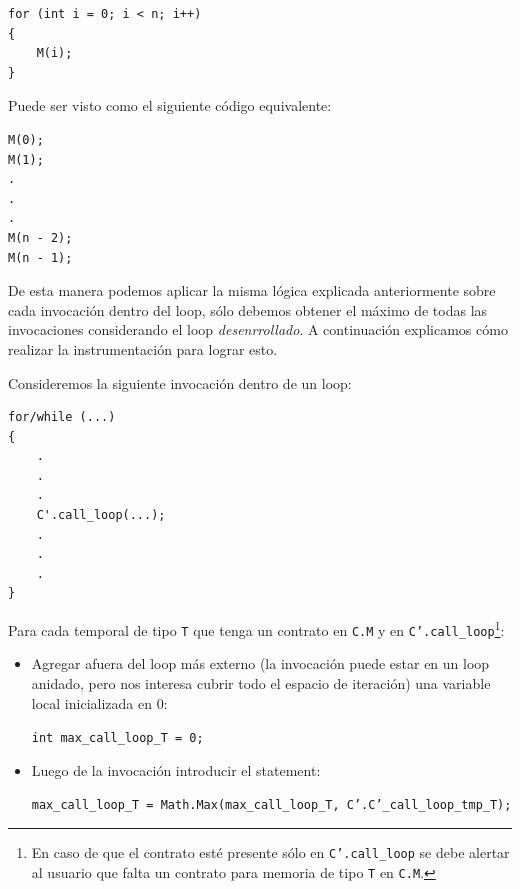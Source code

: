 \documentclass[12pt,a4paper]{article}
\newcommand\mono[1]{\texttt{#1}}
\begin{document}
				\vspace{15pt}
				\begin{lstlisting}[caption=Ejemplo de loop]
for (int i = 0; i < n; i++)
{
	M(i);
}
				\end{lstlisting}

				Puede ser visto como el siguiente código equivalente:

				\vspace{15pt}
				\begin{lstlisting}[caption=Ejemplo de loop \textit{desenrrollado}]
M(0);
M(1);
.
.
.
M(n - 2);
M(n - 1);
				\end{lstlisting}

				De esta manera podemos aplicar la misma lógica explicada anteriormente sobre cada invocación dentro del loop, sólo debemos obtener el máximo de todas las invocaciones considerando el loop \textit{desenrrollado}. A continuación explicamos cómo realizar la instrumentación para lograr esto.

				Consideremos la siguiente invocación dentro de un loop:

				\vspace{15pt}
				\begin{lstlisting}[caption=Loop no instrumentado]
for/while (...)
{
	.
	.
	.
	C'.call_loop(...);
	.
	.
	.
}
				\end{lstlisting}

				Para cada temporal de tipo \mono{T} que tenga un contrato en \mono{C.M} y en \mono{C'.call\_loop}\footnote{En caso de que el contrato esté presente sólo en \mono{C'.call\_loop} se debe alertar al usuario que falta un contrato para memoria de tipo \mono{T} en \mono{C.M}.}:

				\begin{itemize}
					\item Agregar afuera del loop más externo (la invocación puede estar en un loop anidado, pero nos interesa cubrir todo el espacio de iteración) una variable local inicializada en 0:

						\begin{center}
						\mono{int max\_call\_loop\_T = 0;}
						\end{center}

					\item Luego de la invocación introducir el statement:

						\begin{center}
						\mono{max\_call\_loop\_T = Math.Max(max\_call\_loop\_T, C'.C'\_call\_loop\_tmp\_T);}
						\end{center}

				\end{itemize}
\end{document}
